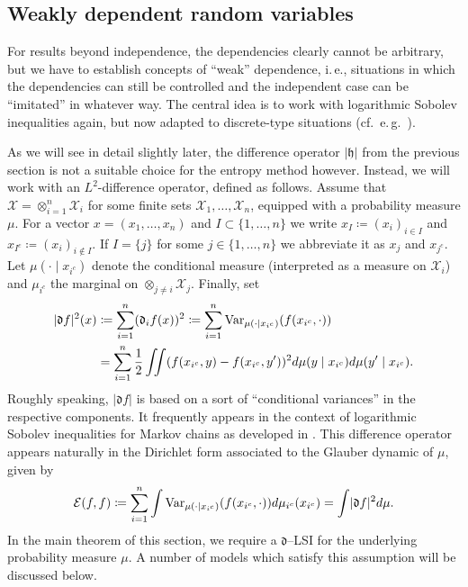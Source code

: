 \documentclass[a4paper,12pt]{amsart}
\numberwithin{equation}{section}
\theoremstyle{remark}
\DeclarePairedDelimiter	{\abs}		{\lvert}	{\rvert}
\newcommand				{\dpartial}	{\mathfrak{d}}
\def\Var{{\mathrm{Var}}}
\begin{document}
\subsection{Weakly dependent random variables}

For results beyond independence, the dependencies clearly cannot be arbitrary, but we have to establish concepts of ``weak'' dependence, i.\,e., situations in which the dependencies can still be controlled and the independent case can be ``imitated'' in whatever way. The central idea is to work with logarithmic Sobolev inequalities again, but now adapted to discrete-type situations (cf.\ e.\,g.\ \cite{DSC96,BT06}).

As we will see in detail slightly later, the difference operator $|\mathfrak{h}|$ from the previous section is not a suitable choice for the entropy method however. Instead, we will work with an $L^2$-difference operator, defined as follows. Assume that $\mathcal{X} = \otimes_{i = 1}^n \mathcal{X}_i$ for some finite sets $\mathcal{X}_1, \ldots, \mathcal{X}_n$, equipped with a probability measure $\mu$. For a vector $x = (x_1, \ldots, x_n)$ and $I \subset \{1,\ldots,n\}$ we write $x_I \coloneqq (x_i)_{i \in I}$ and $x_{I^c} \coloneqq (x_i)_{i \notin I}$. If $I = \{ j\}$ for some $j \in \{1,\ldots,n\}$ we abbreviate it as $x_j$ and $x_{j^c}$. Let $\mu(\cdot \mid x_{i^c})$ denote the conditional measure (interpreted as a measure on $\mathcal{X}_i$) and $\mu_{i^c}$ the marginal on $\otimes_{j \ne i} \mathcal{X}_j$. Finally, set
\begin{align*}
	\abs{\dpartial f}^2(x) &\coloneqq \sum_{i = 1}^n (\dpartial_i f(x))^2 \coloneqq \sum_{i = 1}^n \mathrm{Var}_{\mu(\cdot \mid x_{i^c})}(f(x_{i^c}, \cdot)) \\
	&=\sum_{i = 1}^n \frac{1}{2} \iint (f(x_{i^c},y) - f(x_{i^c},y'))^2 d\mu(y \mid x_{i^c}) d\mu(y' \mid x_{i^c}).
\end{align*}
Roughly speaking, $|\dpartial f|$ is based on a sort of ``conditional variances'' in the respective components. It frequently appears in the context of logarithmic Sobolev inequalities for Markov chains as developed in \cite{DSC96}.
This difference operator appears naturally in the Dirichlet form associated to the Glauber dynamic of $\mu$, given by
\begin{align*}	%
	\mathcal{E}(f,f) \coloneqq \sum_{i = 1}^n \int \Var_{\mu(\cdot \mid x_{i^c})}(f(x_{i^c},\cdot)) d\mu_{i^c}(x_{i^c}) = \int \abs{\dpartial f}^2 d\mu.
\end{align*}
In the main theorem of this section, we require a $\dpartial$--LSI for the underlying probability measure $\mu$. A number of models which satisfy this assumption will be discussed below.
\end{document}
